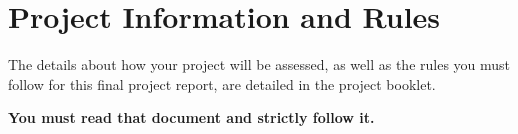 \documentclass[]{final_report}
\begin{document}
\chapter{Project Information and Rules}

The details about how your project will be assessed, as well as the rules you must follow for this final project report, are detailed in the project booklet.

\textbf{You must read that document and strictly follow it.}


\newpage



\label{endpage}
\end{document}
